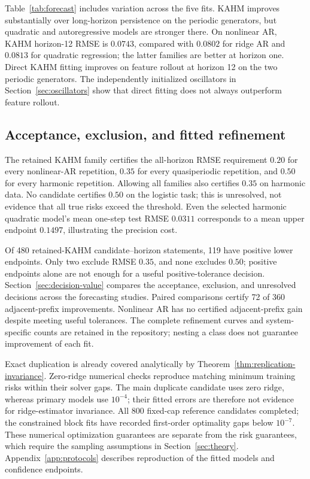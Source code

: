 

Table~\ref{tab:forecast} includes variation across the five fits. KAHM improves
substantially over long-horizon persistence on the periodic generators, but
quadratic and autoregressive models are stronger there. On nonlinear AR,
KAHM horizon-12 RMSE is $0.0743$, compared with $0.0802$ for ridge AR and
$0.0813$ for quadratic regression; the latter families are better at horizon
one. Direct KAHM fitting improves on feature rollout at horizon 12 on the two
periodic generators. The independently initialized oscillators in Section~\ref{sec:oscillators}
show that direct fitting does not always outperform feature rollout.

\subsection{Acceptance, exclusion, and fitted refinement}



The retained KAHM family certifies the all-horizon RMSE requirement $0.20$
for every nonlinear-AR repetition, $0.35$ for every quasiperiodic repetition,
and $0.50$ for every harmonic repetition. Allowing all families also certifies
$0.35$ on harmonic data. No candidate certifies $0.50$ on the logistic task;
this is unresolved, not evidence that all true risks exceed the threshold.
Even the selected harmonic quadratic model's mean one-step test RMSE $0.0311$
corresponds to a mean upper endpoint $0.1497$, illustrating the precision cost.

Of 480 retained-KAHM candidate--horizon statements, 119 have positive lower
endpoints. Only two exclude RMSE $0.35$, and none excludes $0.50$; positive
endpoints alone are not enough for a useful positive-tolerance decision.
Section~\ref{sec:decision-value} compares the acceptance, exclusion, and
unresolved decisions across the forecasting studies.
Paired comparisons certify 72 of 360 adjacent-prefix improvements. Nonlinear
AR has no certified adjacent-prefix gain despite meeting useful tolerances.
The complete refinement curves and system-specific counts are retained in
the repository; nesting a class does not guarantee improvement of each fit.

Exact duplication is already covered analytically by
Theorem~\ref{thm:replication-invariance}. Zero-ridge numerical checks reproduce
matching minimum training risks within their solver gaps. The main duplicate
candidate uses zero ridge, whereas primary models use $10^{-4}$; their fitted
errors are therefore not evidence for ridge-estimator invariance.
All 800 fixed-cap reference candidates completed; the constrained block fits have
recorded first-order optimality gaps below $10^{-7}$. These numerical
optimization guarantees are separate from the risk guarantees, which require
the sampling assumptions in Section~\ref{sec:theory}. Appendix~\ref{app:protocols}
describes reproduction of the fitted models and confidence endpoints.

